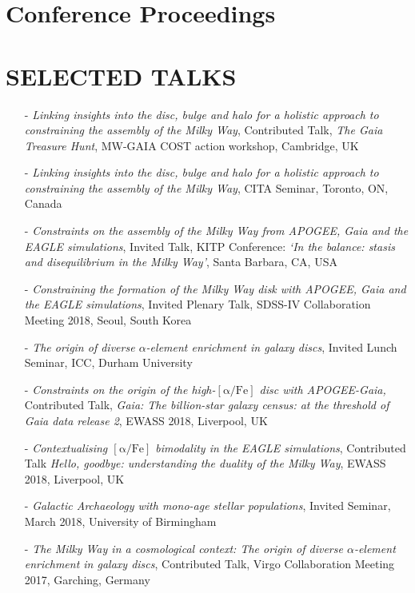 \documentclass[margin]{res}
\begin{document}
\begin{resume}
\section{Conference Proceedings}
\begin{itemize}

 \end{itemize}
\section{SELECTED TALKS}
\begin{itemize}
\item[-] \emph{Linking insights into the disc, bulge and halo for a holistic approach to constraining the assembly of the Milky Way}, Contributed Talk, \emph{The Gaia Treasure Hunt}, MW-GAIA COST action workshop, Cambridge, UK
\item[-] \emph{Linking insights into the disc, bulge and halo for a holistic approach to constraining the assembly of the Milky Way}, CITA Seminar, Toronto, ON, Canada
\item[-] \emph{Constraints on the assembly of the Milky Way from APOGEE, \emph{Gaia} and the EAGLE simulations}, Invited Talk, KITP Conference: \emph{`In the balance: stasis and disequilibrium in the Milky Way'}, Santa Barbara, CA, USA
\item[-] \emph{Constraining the formation of the Milky Way disk with APOGEE, Gaia and the EAGLE simulations}, Invited Plenary Talk, SDSS-IV Collaboration Meeting 2018, Seoul, South Korea
\item[-]\emph{The origin of diverse $\alpha$-element enrichment in galaxy discs}, Invited Lunch Seminar, ICC, Durham University
\item[-] \emph{Constraints on the origin of the high-$\mathrm{[\alpha/Fe]}$ disc with APOGEE-\emph{Gaia},} Contributed Talk, \emph{Gaia: The billion-star galaxy census: at the threshold of Gaia data release 2}, EWASS 2018, Liverpool, UK
\item[-] \emph{Contextualising $\mathrm{[\alpha/Fe]}$ bimodality in the EAGLE simulations}, Contributed Talk \emph{Hello, goodbye: understanding the duality of the Milky Way}, EWASS 2018, Liverpool, UK
\item[-] \emph{Galactic Archaeology with mono-age stellar populations}, Invited Seminar, March 2018, University of Birmingham
\item[-] \emph{The Milky Way in a cosmological context: The origin of diverse $\alpha$-element enrichment in galaxy discs}, Contributed Talk, Virgo Collaboration Meeting 2017, Garching, Germany

\end{itemize}
\end{resume}
\end{document}
